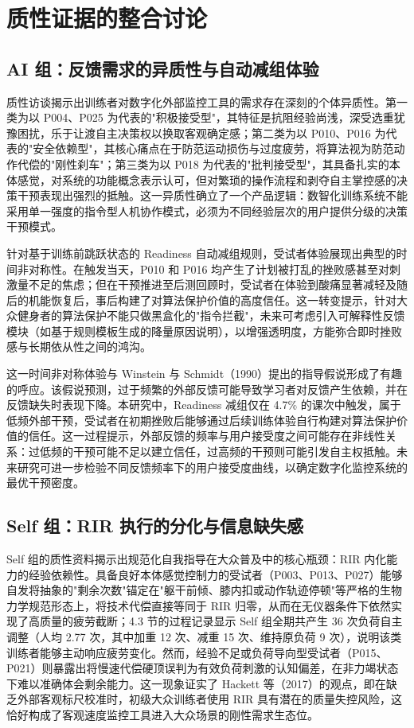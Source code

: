 \documentclass[UTF8,zihao=-4,twoside,openany]{ctexbook}
\begin{document}
\section{质性证据的整合讨论}

\subsection{AI 组：反馈需求的异质性与自动减组体验}
质性访谈揭示出训练者对数字化外部监控工具的需求存在深刻的个体异质性。第一类为以 P004、P025 为代表的"积极接受型"，其特征是抗阻经验尚浅，深受选重犹豫困扰，乐于让渡自主决策权以换取客观确定感；第二类为以 P010、P016 为代表的"安全依赖型"，其核心痛点在于防范运动损伤与过度疲劳，将算法视为防范动作代偿的"刚性刹车"；第三类为以 P018 为代表的"批判接受型"，其具备扎实的本体感觉，对系统的功能概念表示认可，但对繁琐的操作流程和剥夺自主掌控感的决策干预表现出强烈的抵触。这一异质性确立了一个产品逻辑：数智化训练系统不能采用单一强度的指令型人机协作模式，必须为不同经验层次的用户提供分级的决策干预模式。

针对基于训练前跳跃状态的 Readiness 自动减组规则，受试者体验展现出典型的时间非对称性。在触发当天，P010 和 P016 均产生了计划被打乱的挫败感甚至对刺激量不足的焦虑；但在干预推进至后测回顾时，受试者在体验到酸痛显著减轻及随后的机能恢复后，事后构建了对算法保护价值的高度信任。这一转变提示，针对大众健身者的算法保护不能只做黑盒化的"指令拦截"，未来可考虑引入可解释性反馈模块（如基于规则模板生成的降量原因说明），以增强透明度，方能弥合即时挫败感与长期依从性之间的鸿沟。

这一时间非对称体验与 Winstein 与 Schmidt（1990）提出的指导假说形成了有趣的呼应。该假说预测，过于频繁的外部反馈可能导致学习者对反馈产生依赖，并在反馈缺失时表现下降。本研究中，Readiness 减组仅在 4.7\% 的课次中触发，属于低频外部干预，受试者在初期挫败后能够通过后续训练体验自行构建对算法保护价值的信任。这一过程提示，外部反馈的频率与用户接受度之间可能存在非线性关系：过低频的干预可能不足以建立信任，过高频的干预则可能引发自主权抵触。未来研究可进一步检验不同反馈频率下的用户接受度曲线，以确定数字化监控系统的最优干预密度。

\subsection{Self 组：RIR 执行的分化与信息缺失感}
Self 组的质性资料揭示出规范化自我指导在大众普及中的核心瓶颈：RIR 内化能力的经验依赖性。具备良好本体感觉控制力的受试者（P003、P013、P027）能够自发将抽象的"剩余次数"锚定在"躯干前倾、膝内扣或动作轨迹停顿"等严格的生物力学规范形态上，将技术代偿直接等同于 RIR 归零，从而在无仪器条件下依然实现了高质量的疲劳截断；4.3 节的过程记录显示 Self 组全期共产生 36 次负荷自主调整（人均 2.77 次，其中加重 12 次、减重 15 次、维持原负荷 9 次），说明该类训练者能够主动响应疲劳变化。然而，经验不足或负荷导向型受试者（P015、P021）则暴露出将慢速代偿硬顶误判为有效负荷刺激的认知偏差，在非力竭状态下难以准确体会剩余能力。这一现象证实了 Hackett 等（2017）的观点，即在缺乏外部客观标尺校准时，初级大众训练者使用 RIR 具有潜在的质量失控风险，这恰好构成了客观速度监控工具进入大众场景的刚性需求生态位。
\end{document}
